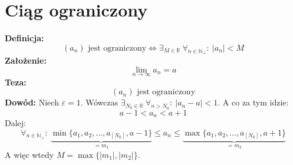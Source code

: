 \documentclass [a4paper, 12pt, oneside]{article}
\begin{document}
\section{Ciąg ograniczony}
\textbf{Definicja:}
\[
    (a_n)\textrm{ jest ograniczony}\Longleftrightarrow \exists_{M\in\mathbb{R}}~\forall_{n\in\mathbb{N}_+}:~|a_n| < M
\]
\textbf{Założenie:}
\[
    \lim_{n\to\infty} a_n = a
\]
\textbf{Teza:}
\[
    (a_n)\textrm{ jest ograniczony}
\]
\textbf{Dowód:}
Niech $\varepsilon = 1$. Wówczas $\exists_{N_0 \in \mathbb{R}}~\forall_{n>N_0}:~\left|a_n-a\right| < 1$. A co za tym idzie:
\[
    a-1 < a_n < a+1
\]
Dalej:
\[
    \forall_{n\in\mathbb{N}_+}:~\underbrace{\min\{a_1, a_2,\dots,a_{[N_0]}, a-1\}}_{= m_1} \le a_n \le \underbrace{\max\{a_1, a_2, \dots, a_{[N_0]}, a+1\}}_{= m_2}
\]
A więc wtedy $M = \max\{|m_1|, |m_2|\}$.
\end{document}
